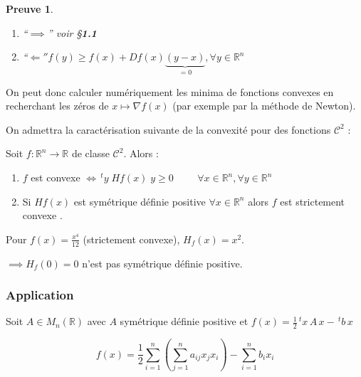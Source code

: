 \documentclass[a4paper,11pt]{article}
\newcommand{\R}{\mathbb{R}}
\newcommand{\tpo}[1]{\,^t#1}
\newcommand{\deffonc}[3]{#1 : #2 \longrightarrow #3}
\newcommand{\Co}{\mathcal{C}}
\theoremstyle{plain} %
\newtheorem{preuve}{Preuve}
\begin{document}
\begin{preuve}
    \begin{enumerate}[label=•]
        \item ``$\implies$'' voir \S \textbf{1.1}
        \item ``$\Longleftarrow'' f(y) \geq f(x) + Df(x)\underbrace{(y-x)}_{= 0}, \forall y \in \R^n$
    \end{enumerate}
\end{preuve}

\begin{remark}
    On peut donc calculer numériquement les minima de fonctions convexes en recherchant
    les zéros de $x \mapsto \nabla f(x)$ (par exemple par la méthode de Newton).

    On admettra la caractérisation suivante de la convexité pour des fonctions $\Co^2$ :
\end{remark}

\begin{lemme}
    Soit $\deffonc{f}{\R^n}{\R}$ de classe $\Co^2$. Alors :

    \begin{enumerate}[label=•]
        \item $f$ est convexe $\iff \tpo{y} \; Hf(x) \; y \geq 0 \hspace{1cm} \forall x \in \R^n, \forall y \in \R^n$

        \item Si $Hf(x)$ est symétrique définie positive $\forall x \in \R^n$ alors $f$ est strictement convexe \footnotemark.
    \end{enumerate}
\end{lemme}

\begin{remark}
    Pour $f(x) = \frac{x^4}{12}$ (strictement convexe), $H_f(x) = x^2$.

    $\implies H_f(0) = 0$ n'est pas symétrique définie positive.
\end{remark}

\subsubsection*{Application}
Soit $A \in M_n(\R)$ avec $A$ symétrique définie positive et $f(x)=\frac{1}{2} \tpo{x} \, A \, x - \tpo{b} \, x$

\[
    f(x) = \frac{1}{2} \sum_{i=1}^n \left( \sum_{j=1}^n a_{ij}x_j x_i \right) - \sum_{i=1}^n b_i x_i
\]
\end{document}
